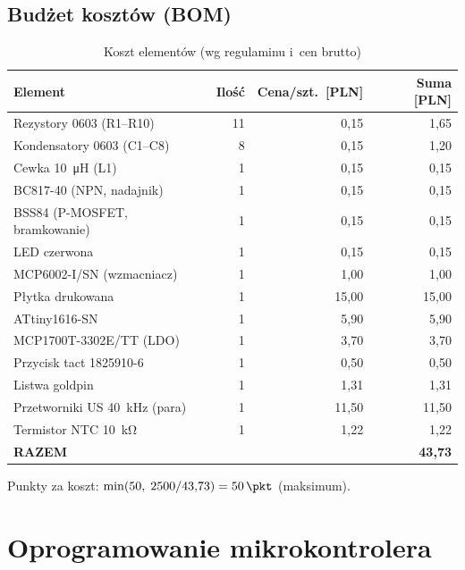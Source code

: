 \documentclass[a4paper,11pt]{article}
\begin{document}
\subsection{Budżet kosztów (BOM)}
\label{sec:bom}

\begin{table}[H]
	\centering
	\caption{Koszt elementów (wg regulaminu i~cen brutto)}
	\label{tab:bom}
	\footnotesize
	\begin{tabularx}{\textwidth}{Xrrr}
		\toprule
		\textbf{Element} & \textbf{Ilość} & \textbf{Cena/szt.\ [PLN]} & \textbf{Suma [PLN]} \\
		\midrule
		Rezystory 0603 (R1--R10)        & 11 & 0{,}15 & 1{,}65 \\
		Kondensatory 0603 (C1--C8)      & 8  & 0{,}15 & 1{,}20 \\
		Cewka \SI{10}{\micro\henry} (L1)& 1  & 0{,}15 & 0{,}15 \\
		BC817-40 (NPN, nadajnik)        & 1  & 0{,}15 & 0{,}15 \\
		BSS84 (P-MOSFET, bramkowanie)   & 1  & 0{,}15 & 0{,}15 \\
		LED czerwona                    & 1  & 0{,}15 & 0{,}15 \\
		MCP6002-I/SN (wzmacniacz)       & 1  & 1{,}00 & 1{,}00 \\
		Płytka drukowana                & 1  & 15{,}00& 15{,}00 \\
		ATtiny1616-SN                   & 1  & 5{,}90 & 5{,}90 \\
		MCP1700T-3302E/TT (LDO)         & 1  & 3{,}70 & 3{,}70 \\
		Przycisk tact 1825910-6         & 1  & 0{,}50 & 0{,}50 \\
		Listwa goldpin                  & 1  & 1{,}31 & 1{,}31 \\
		Przetworniki US \SI{40}{\kilo\hertz} (para) & 1 & 11{,}50 & 11{,}50 \\
		Termistor NTC \SI{10}{\kilo\ohm}& 1  & 1{,}22 & 1{,}22 \\
		\midrule
		\textbf{RAZEM} & & & \textbf{43{,}73} \\
		\bottomrule
	\end{tabularx}
\end{table}
Punkty za koszt: $\min(50,\; 2500/43{,}73) = \SI{50}{\pkt}$ (maksimum).

\section{Oprogramowanie mikrokontrolera}
\label{sec:firmware}
\end{document}
